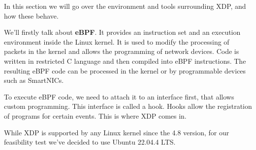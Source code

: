 In this section we will go over the environment and tools surrounding XDP, and how these behave.

We'll firstly talk about \textbf{eBPF}. It provides an instruction set and an execution environment inside the Linux kernel. It is used to modify the processing of packets in the kernel and allows the programming of network devices. Code is written in restricted C language and then compiled into eBPF instructions. The resulting eBPF code can be processed in the kernel or by programmable devices such as SmartNICs.\cite{FastXDP}

To execute eBPF code, we need to attach it to an interface first, that allows custom programming. This interface is called a hook. Hooks allow the registration of programs for certain events. This is where XDP comes in.

While XDP is supported by any Linux kernel since the 4.8 version, for our feasibility test we've decided to use Ubuntu 22.04.4 LTS.

